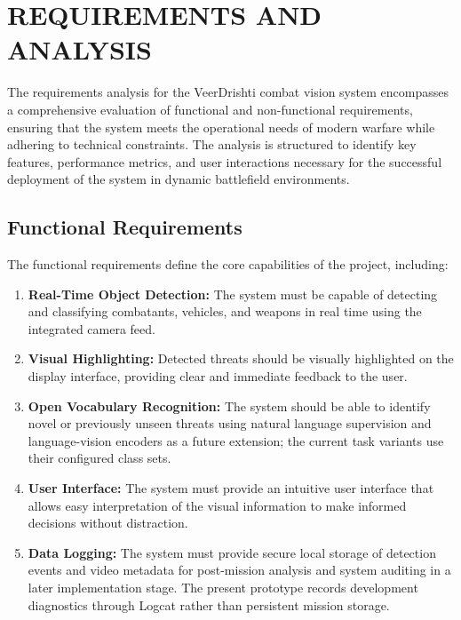 \chapter{REQUIREMENTS AND ANALYSIS}\label{ch:requirements}
The requirements analysis for the VeerDrishti combat vision system encompasses a comprehensive
evaluation of functional and non-functional requirements, ensuring that the system meets the
operational needs of modern warfare while adhering to technical constraints. The analysis is
structured to identify key features, performance metrics, and user interactions necessary for the
successful deployment of the system in dynamic battlefield environments.

\section{Functional Requirements}\label{sec:functional}
The functional requirements define the core capabilities of the project, including:
\begin{enumerate}[label=\roman*.]
  \item \textbf{Real-Time Object Detection:} The system must be capable of detecting and classifying
    combatants, vehicles, and weapons in real time using the integrated camera feed.
  \item \textbf{Visual Highlighting:} Detected threats should be visually highlighted on the display
    interface, providing clear and immediate feedback to the user.
  \item \textbf{Open Vocabulary Recognition:} The system should be able to identify novel or
    previously unseen threats using natural language supervision and language-vision encoders as
    a future extension; the current task variants use their configured class sets.
  \item \textbf{User Interface:} The system must provide an intuitive user interface that allows
    easy interpretation of the visual information to make informed decisions without distraction.
  \item \textbf{Data Logging:} The system must provide secure local storage of detection events and
     video metadata for post-mission analysis and system auditing in a later implementation stage.
     The present prototype records development diagnostics through Logcat rather than persistent
     mission storage.
  \label{end:functional}
\end{enumerate}
